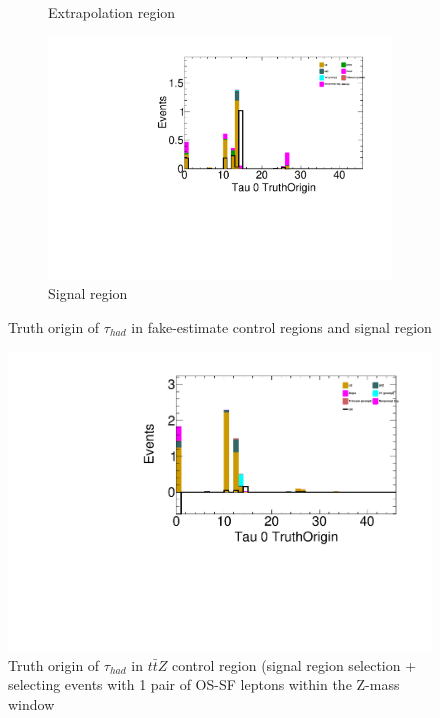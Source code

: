 \documentclass[11pt]{article}
\begin{document}
\begin{figure}[H]
\begin{subfigure}[b]{.5\textwidth}
			\caption{Extrapolation region}
		\end{subfigure}
		\quad
		\begin{subfigure}[b]{.5\textwidth}
			\includegraphics[width=0.82\linewidth]{figures/Plots_MC_April10_pp8-new_PromptPlots/3ltau_SR_TightLepMVA_TauMedium_Tau0TruthOrigin.pdf}
			\caption{Signal region}
		\end{subfigure}
		\caption{Truth origin of $\tau_{had}$ in fake-estimate control regions and signal region}
	\end{figure}


	\begin{figure}[H]
		\centering
		\includegraphics[width=0.65\linewidth]{figures/Plots_MC_April10_pp8-new_PromptPlots/3ltau_ttZ_CR_TightLepMVA_TauMedium_Tau0TruthOrigin.pdf}
		\caption{Truth origin of $\tau_{had}$ in $t\bar{t}Z$ control region (signal region selection + selecting events with 1 pair of OS-SF leptons within the Z-mass window}
	\end{figure}		
\end{document}
